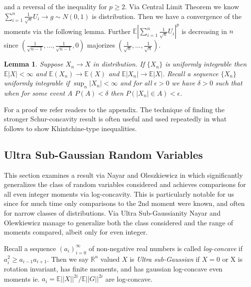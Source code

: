 \documentclass[10pt]{article}
\newcommand{\E}{\mathbb{E}}
\newcommand{\1}{\textbf{1}}
\newcommand{\R}{\mathbb{R}}
\newcommand{\norm}[1]{\left\lvert\left\lvert#1\right\rvert\right\rvert}
\newcommand{\normOne}[1]{\left\lvert#1\right\rvert}
\newtheorem{lemma}{Lemma}[subsection]
\theoremstyle{remark}
\theoremstyle{definition}
\begin{document}
and a reversal of the inequality for $p \geq 2$. Via Central Limit Theorem we know $\sum_{i=1}^n \frac{1}{\sqrt{n}} U_i \to g \sim N(0,1)$ is distribution. Then we have a convergence of the moments via the following lemma. Further $\E\normOne{\sum_{i=1}^n \frac{1}{\sqrt{n}}U_i}^p$ is decreasing in $n$ since $(\frac{1}{\sqrt{n-1}},...,\frac{1}{\sqrt{n-1}},0)$ majorizes $(\frac{1}{\sqrt{n}},...,\frac{1}{\sqrt{n}})$.


\begin{lemma}\label{lem:URV5}
	Suppose $X_n \to X$ in distribution. If $\{X_n\}$ is uniformly integrable then $\E|X| < \infty$ and $\E(X_n) \to \E(X)$ and $\E |X_n| \to \E |X|$. Recall a sequence $\{X_n\}$ uniformly integrable if $\sup_n |X_n| < \infty$ and for all $\epsilon > 0$ we have $\delta > 0$ such that when for some event A $P(A) < \delta$ then $P(|X_n| \in A) < \epsilon$. 
\end{lemma}

For a proof we refer readers to the appendix. The technique of finding the stronger Schur-concavity result is often useful and used repeatedly in what follows to show Khintchine-type inequalities.



\subsection{Ultra Sub-Gaussian Random Variables}

This section examines a result via Nayar and Oleszkiewicz in \cite{NO} which significantly generalizes the class of random variables considered and achieves comparisons for all even integer moments via log-concavity. This is particularly notable for us since for much time only comparisons to the 2nd moment were known, and often for narrow classes of distributions. Via Ultra Sub-Gaussianity Nayar and Olewkiewicz manage to generalize both the class considered and the range of moments compared, albeit only for even integer.

Recall a sequence $(a_i)_{i=0}^{\infty}$ of non-negative real numbers is called \textit{log-concave} if $a_i^2 \geq a_{i-1}a_{i+1}$. Then we say $\R^n$ valued $X$ is \textit{Ultra sub-Gaussian} if $X=0$ or X is rotation invariant, has finite moments, and has gaussian log-concave even moments ie. $a_i = \E \norm{X}^{2i}/\E \norm{G}^{2i}$ are log-concave.
\end{document}
